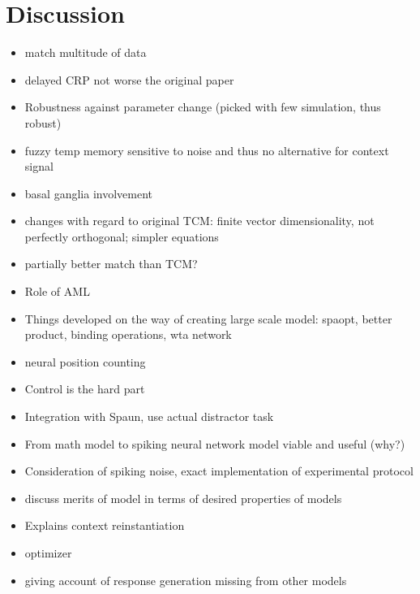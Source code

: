 \chapter{Discussion}
\begin{itemize}
    \item match multitude of data
    \item delayed CRP not worse the original paper
    \item Robustness against parameter change (picked with few simulation, thus robust)
    \item fuzzy temp memory sensitive to noise and thus no alternative for context signal
    \item basal ganglia involvement
    \item changes with regard to original TCM\@: finite vector dimensionality, not perfectly orthogonal; simpler equations
    \item partially better match than TCM\@?
    \item Role of AML
    \item Things developed on the way of creating large scale model: spaopt, better product, binding operations, wta network
    \item neural position counting
    \item Control is the hard part
    \item Integration with Spaun, use actual distractor task
    \item From math model to spiking neural network model viable and useful (why?)
    \item Consideration of spiking noise, exact implementation of experimental protocol
    \item discuss merits of model in terms of desired properties of models
    \item Explains context reinstantiation
    \item optimizer
    \item giving account of response generation missing from other models
\end{itemize}
